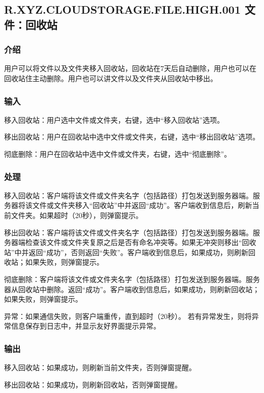 
\subsection{R.XYZ.CLOUDSTORAGE.FILE.HIGH.001 文件：回收站}

\subsubsection{介绍} 
用户可以将文件以及文件夹移入回收站，回收站在7天后自动删除，用户也可以在回收站住主动删除。用户也可以讲文件以及文件夹从回收站中移出。

\subsubsection{输入} 
移入回收站：用户选中文件或文件夹，右键，选中“移入回收站”选项。

移出回收站：用户在回收站中选中文件或文件夹，右键，选中“移出回收站”选项。

彻底删除：用户在回收站中选中文件或文件夹，右键，选中“彻底删除”。

\subsubsection{处理} 
移入回收站：客户端将该文件或文件夹名字（包括路径）打包发送到服务器端。服务器将该文件或文件夹移入“回收站”中并返回“成功”。客户端收到信息后，刷新当前文件夹。如果超时（20秒），则弹窗提示。

移出回收站：客户端将该文件或文件夹名字（包括路径）打包发送到服务器端。服务器端检查该文件或文件夹复原之后是否有命名冲突等。如果无冲突则移出“回收站”中并返回“成功”，否则返回“失败”。客户端收到信息后，如果成功，则刷新回收站；如果失败，则弹窗提示。

彻底删除：客户端将该文件或文件夹名字（包括路径）打包发送到服务器端。服务器从回收站中删除。返回“成功”。客户端收到信息后，如果成功，则刷新回收站；如果失败，则弹窗提示。

异常：如果通信失败，则客户端重传，直到超时（20秒）。
若有异常发生，则将异常信息保存到日志中，并显示友好界面提示异常。

\subsubsection{输出} 
移入回收站：如果成功，则刷新当前文件夹，否则弹窗提醒。

移出回收站：如果成功，则刷新回收站，否则弹窗提醒。

